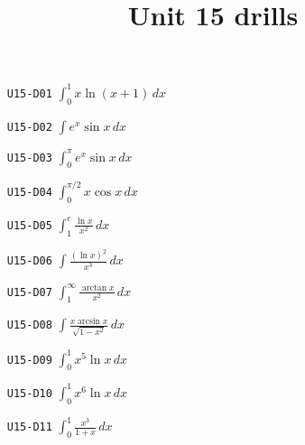 
\title{Unit 15 drills}

\maketitle
\begin{enumerate}
  \item[\texttt{U15-D01}] $\displaystyle\int_{0}^{1}x\ln(x+1)\,dx$
  \item[\texttt{U15-D02}] $\displaystyle\int e^{x}\sin x\,dx$
  \item[\texttt{U15-D03}] $\displaystyle\int_{0}^{\pi}e^{x}\sin x\,dx$
  \item[\texttt{U15-D04}] $\displaystyle\int_{0}^{\pi/2}x\cos x\,dx$
  \item[\texttt{U15-D05}] $\displaystyle\int_{1}^{e}\frac{\ln x}{x^{2}}\,dx$
  \item[\texttt{U15-D06}] $\displaystyle\int\frac{(\ln x)^{2}}{x^{3}}\,dx$
  \item[\texttt{U15-D07}] $\displaystyle\int_{1}^{\infty}\frac{\arctan x}{x^{2}}\,dx$
  \item[\texttt{U15-D08}] $\displaystyle\int\frac{x\arcsin x}{\sqrt{1-x^{2}}}\,dx$
  \item[\texttt{U15-D09}] $\displaystyle\int_{0}^{1}x^{5}\ln x\,dx$
  \item[\texttt{U15-D10}] $\displaystyle\int_{0}^{1}x^{6}\ln x\,dx$
  \item[\texttt{U15-D11}] $\displaystyle\int_{0}^{1}\frac{x^{3}}{1+x}\,dx$
\end{enumerate}

